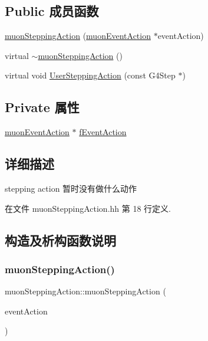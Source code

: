 \subsection*{Public 成员函数}
\begin{DoxyCompactItemize}
\item 
\hyperlink{classmuonSteppingAction_af61195514a24d468d05e62b421b360f1}{muon\+Stepping\+Action} (\hyperlink{classmuonEventAction}{muon\+Event\+Action} $\ast$event\+Action)
\item 
virtual \hyperlink{classmuonSteppingAction_a211068d7000014897633714af0f47b08}{$\sim$muon\+Stepping\+Action} ()
\item 
virtual void \hyperlink{classmuonSteppingAction_a8e1d7a65edc88bab12e7b0ff91ee7183}{User\+Stepping\+Action} (const G4\+Step $\ast$)
\end{DoxyCompactItemize}
\subsection*{Private 属性}
\begin{DoxyCompactItemize}
\item 
\hyperlink{classmuonEventAction}{muon\+Event\+Action} $\ast$ \hyperlink{classmuonSteppingAction_a79d6a211a68c4390cc75675876ad1a62}{f\+Event\+Action}
\end{DoxyCompactItemize}


\subsection{详细描述}
stepping action 暂时没有做什么动作 

在文件 muon\+Stepping\+Action.\+hh 第 18 行定义.



\subsection{构造及析构函数说明}
\mbox{\label{classmuonSteppingAction_af61195514a24d468d05e62b421b360f1}} 
\subsubsection{\texorpdfstring{muon\+Stepping\+Action()}{muonSteppingAction()}}
{\footnotesize\ttfamily muon\+Stepping\+Action\+::muon\+Stepping\+Action (\begin{DoxyParamCaption}\item[{\hyperlink{classmuonEventAction}{muon\+Event\+Action} $\ast$}]{event\+Action }\end{DoxyParamCaption})}



